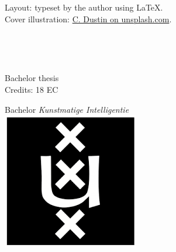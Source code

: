     \restoregeometry

\newpage


\vspace*{0.8\textheight}
\noindent
Layout: typeset by the author using \LaTeX. \\
Cover illustration: \href{https://unsplash.com/@dianamia}{C. Dustin on
unsplash.com}.
\restoregeometry

\newpage

\begin{center}

\vspace{2.5cm}


\begin{Huge}
\theTitle
\end{Huge} \\

\vspace{0.5 cm}

\begin{Large}
\theSubTitle
\end{Large}

\vspace{1.5cm}

\theAuthor\\
\theStudentID

\vspace{1.5cm}

Bachelor thesis\\
Credits: 18 EC

\vspace{0.5cm}

Bachelor \textit{Kunstmatige Intelligentie} \\
\vspace{0.25cm}
\includegraphics[width=0.075\paperwidth]{fig/uva_logo} \\
\vspace{0.1cm}


\end{center}
